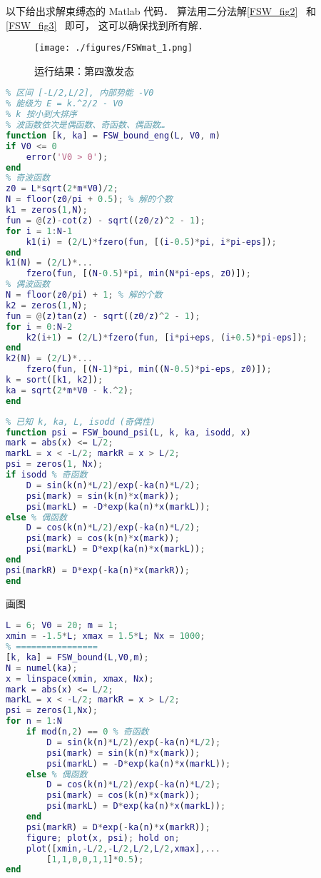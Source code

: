 

以下给出求解束缚态的 Matlab 代码． 算法用二分法解\autoref{FSW_fig2}~ 和\autoref{FSW_fig3}~ 即可， 这可以确保找到所有解．

\begin{figure}[ht]
\centering
\texttt{[image: ./figures/FSWmat\_1.png]}
\caption{运行结果：第四激发态} \label{FSWmat_fig1}
\end{figure}

\begin{lstlisting}[language=matlab, caption=FSW\_bound\_eng.m]
% 计算有限深势阱的束缚态参数 k, ka
% 区间 [-L/2,L/2], 内部势能 -V0
% 能级为 E = k.^2/2 - V0
% k 按小到大排序
% 波函数依次是偶函数、奇函数、偶函数…
function [k, ka] = FSW_bound_eng(L, V0, m)
if V0 <= 0
    error('V0 > 0');
end
% 奇波函数
z0 = L*sqrt(2*m*V0)/2;
N = floor(z0/pi + 0.5); % 解的个数
k1 = zeros(1,N);
fun = @(z)-cot(z) - sqrt((z0/z)^2 - 1);
for i = 1:N-1
    k1(i) = (2/L)*fzero(fun, [(i-0.5)*pi, i*pi-eps]);
end
k1(N) = (2/L)*...
    fzero(fun, [(N-0.5)*pi, min(N*pi-eps, z0)]);
% 偶波函数
N = floor(z0/pi) + 1; % 解的个数
k2 = zeros(1,N);
fun = @(z)tan(z) - sqrt((z0/z)^2 - 1);
for i = 0:N-2
    k2(i+1) = (2/L)*fzero(fun, [i*pi+eps, (i+0.5)*pi-eps]);
end
k2(N) = (2/L)*...
    fzero(fun, [(N-1)*pi, min((N-0.5)*pi-eps, z0)]);
k = sort([k1, k2]);
ka = sqrt(2*m*V0 - k.^2);
end
\end{lstlisting}

\begin{lstlisting}[language=matlab, caption=FSW\_bound\_psi.m]
% 已知方势阱束缚态波函数的参数， 求波函数 psi(x)
% 已知 k, ka, L, isodd (奇偶性)
function psi = FSW_bound_psi(L, k, ka, isodd, x)
mark = abs(x) <= L/2;
markL = x < -L/2; markR = x > L/2;
psi = zeros(1, Nx);
if isodd % 奇函数
    D = sin(k(n)*L/2)/exp(-ka(n)*L/2);
    psi(mark) = sin(k(n)*x(mark));
    psi(markL) = -D*exp(ka(n)*x(markL));
else % 偶函数
    D = cos(k(n)*L/2)/exp(-ka(n)*L/2);
    psi(mark) = cos(k(n)*x(mark));
    psi(markL) = D*exp(ka(n)*x(markL));
end
psi(markR) = D*exp(-ka(n)*x(markR));
end
\end{lstlisting}

画图
\begin{lstlisting}[language=matlab, caption=FSW\_bound\_demo.m]
% === 参数设置 ===
L = 6; V0 = 20; m = 1;
xmin = -1.5*L; xmax = 1.5*L; Nx = 1000;
% ================
[k, ka] = FSW_bound(L,V0,m);
N = numel(ka);
x = linspace(xmin, xmax, Nx);
mark = abs(x) <= L/2;
markL = x < -L/2; markR = x > L/2;
psi = zeros(1,Nx);
for n = 1:N
    if mod(n,2) == 0 % 奇函数
        D = sin(k(n)*L/2)/exp(-ka(n)*L/2);
        psi(mark) = sin(k(n)*x(mark));
        psi(markL) = -D*exp(ka(n)*x(markL));
    else % 偶函数
        D = cos(k(n)*L/2)/exp(-ka(n)*L/2);
        psi(mark) = cos(k(n)*x(mark));
        psi(markL) = D*exp(ka(n)*x(markL));
    end
    psi(markR) = D*exp(-ka(n)*x(markR));
    figure; plot(x, psi); hold on;
    plot([xmin,-L/2,-L/2,L/2,L/2,xmax],...
        [1,1,0,0,1,1]*0.5);
end
\end{lstlisting}
